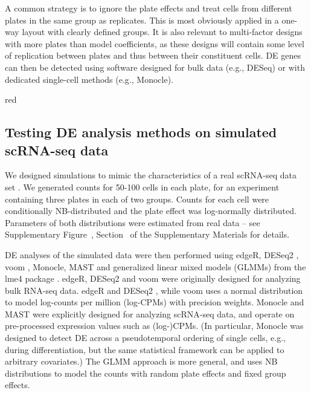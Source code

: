 \documentclass[oupdraft]{bio}
\begin{document}
A common strategy is to ignore the plate effects and treat cells from different plates in the same group as replicates.
This is most obviously applied in a one-way layout with clearly defined groups.
It is also relevant to multi-factor designs with more plates than model coefficients, as these designs will contain some level of replication between plates and thus between their constituent cells.
DE genes can then be detected using software designed for bulk data (e.g., DESeq) or with dedicated single-cell methods (e.g., Monocle).

\begin{color}{red}
\subsection{Testing DE analysis methods on simulated scRNA-seq data}
We designed simulations to mimic the characteristics of a real scRNA-seq data set \citep{kolod2015single}.
We generated counts for 50-100 cells in each plate, for an experiment containing three plates in each of two groups.
Counts for each cell were conditionally NB-distributed and the plate effect was log-normally distributed.
Parameters of both distributions were estimated from real data -- see Supplementary Figure~\suppparamsim{}, Section~\suppsimulation{} of the Supplementary Materials for details.

DE analyses of the simulated data were then performed using edgeR, DESeq2 \citep{love2014moderated}, voom \citep{law2014voom}, Monocle, MAST \citep{finak2015mast} and generalized linear mixed models (GLMMs) from the lme4 package \citep{bates2015fitting}.
edgeR, DESeq2 and voom were originally designed for analyzing bulk RNA-seq data.
edgeR and DESeq2 , while voom uses a normal distribution to model log-counts per million (log-CPMs) with precision weights.
Monocle and MAST were explicitly designed for analyzing scRNA-seq data, and operate on pre-processed expression values such as (log-)CPMs.
(In particular, Monocle was designed to detect DE across a pseudotemporal ordering of single cells, e.g., during differentiation, but the same statistical framework can be applied to arbitrary covariates.)
The GLMM approach is more general, and uses NB distributions to model the counts with random plate effects and fixed group effects.
\end{color}
\end{document}
